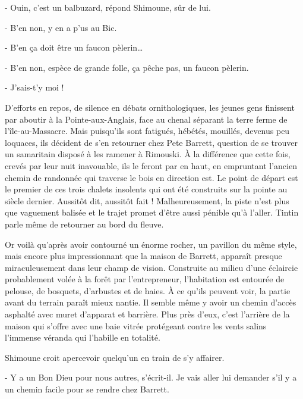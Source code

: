- Ouin, c’est un balbuzard, répond Shimoune, sûr de lui.

- B’en non, y en a p’us au Bic.

- B’en ça doit être un faucon pèlerin…

- B’en non, espèce de grande folle, ça pêche pas, un faucon pèlerin.

- J’sais-t’y moi !

D’efforts en repos, de silence en débats ornithologiques, les jeunes gens finissent par aboutir à la Pointe-aux-Anglais, face au chenal séparant la terre ferme de l’île-au-Massacre. Mais puisqu’ils sont fatigués, hébétés, mouillés, devenus peu loquaces, ils décident de s’en retourner chez Pete Barrett, question de se trouver un samaritain disposé à les ramener à Rimouski. À la différence que cette fois, crevés par leur nuit inavouable, ils le feront par en haut, en empruntant l’ancien chemin de randonnée qui traverse le bois en direction est. Le point de départ est le premier de ces trois chalets insolents qui ont été construits sur la pointe au siècle dernier. Aussitôt dit, aussitôt fait ! Malheureusement, la piste n’est plus que vaguement balisée et le trajet promet d’être aussi pénible qu’à l’aller. Tintin parle même de retourner au bord du fleuve.

Or voilà qu’après avoir contourné un énorme rocher, un pavillon du même style, mais encore plus impressionnant que la maison de Barrett, apparaît presque miraculeusement dans leur champ de vision. Construite au milieu d’une éclaircie probablement volée à la forêt par l’entrepreneur, l’habitation est entourée de pelouse, de bosquets, d’arbustes et de haies. À ce qu’ils peuvent voir, la partie avant du terrain paraît mieux nantie. Il semble même y avoir un chemin d’accès asphalté avec muret d’apparat et barrière. Plus près d’eux, c’est l’arrière de la maison qui s’offre avec une baie vitrée protégeant contre les vents salins l’immense véranda qui l’habille en totalité.

Shimoune croit apercevoir quelqu’un en train de s’y affairer.

- Y a un Bon Dieu pour nous autres, s’écrit-il. Je vais aller lui demander s’il y a un chemin facile pour se rendre chez Barrett.

